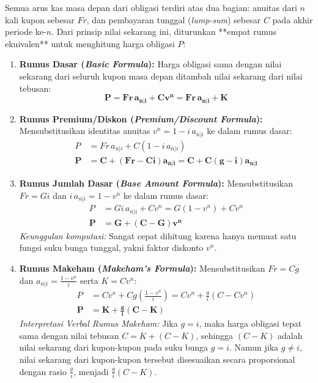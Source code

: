 \documentclass[11pt,a4paper]{article}
\begin{document}
Semua arus kas masa depan dari obligasi terdiri atas dua bagian: anuitas dari $n$ kali kupon sebesar $Fr$, dan pembayaran tunggal (\textit{lump-sum}) sebesar $C$ pada akhir periode ke-$n$. Dari prinsip nilai sekarang ini, diturunkan **empat rumus ekuivalen** untuk menghitung harga obligasi $P$:

\begin{theorembox}
\begin{enumerate}[label=\textbf{\arabic*.}]
    \item \textbf{Rumus Dasar (\textit{Basic Formula}):}
    Harga obligasi sama dengan nilai sekarang dari seluruh kupon masa depan ditambah nilai sekarang dari nilai tebusan:
    \begin{equation}
        \mathbf{P = Fr \, a_{\overline{n}|i} + C v^n = Fr \, a_{\overline{n}|i} + K}
    \end{equation}

    \item \textbf{Rumus Premium/Diskon (\textit{Premium/Discount Formula}):}
    Mensubstitusikan identitas anuitas $v^n = 1 - i \, a_{\overline{n}|i}$ ke dalam rumus dasar:
    \begin{align}
        P &= Fr \, a_{\overline{n}|i} + C(1 - i \, a_{\overline{n}|i}) \nonumber \\
        \mathbf{P} &= \mathbf{C + (Fr - Ci) a_{\overline{n}|i} = C + C(g - i) a_{\overline{n}|i}}
    \end{align}

    \item \textbf{Rumus Jumlah Dasar (\textit{Base Amount Formula}):}
    Mensubstitusikan $Fr = Gi$ dan $i \, a_{\overline{n}|i} = 1 - v^n$ ke dalam rumus dasar:
    \begin{align}
        P &= Gi \, a_{\overline{n}|i} + C v^n = G(1 - v^n) + C v^n \nonumber \\
        \mathbf{P} &= \mathbf{G + (C - G) v^n}
    \end{align}
    \textit{Keunggulan komputasi:} Sangat cepat dihitung karena hanya memuat satu fungsi suku bunga tunggal, yakni faktor diskonto $v^n$.

    \item \textbf{Rumus Makeham (\textit{Makeham's Formula}):}
    Mensubstitusikan $Fr = Cg$ dan $a_{\overline{n}|i} = \frac{1 - v^n}{i}$ serta $K = C v^n$:
    \begin{align}
        P &= C v^n + Cg \left( \frac{1 - v^n}{i} \right) = C v^n + \frac{g}{i} (C - C v^n) \nonumber \\
        \mathbf{P} &= \mathbf{K + \frac{g}{i}(C - K)}
    \end{align}
    \textit{Interpretasi Verbal Rumus Makeham:} Jika $g = i$, maka harga obligasi tepat sama dengan nilai tebusan $C = K + (C - K)$, sehingga $(C - K)$ adalah nilai sekarang dari kupon-kupon pada suku bunga $g=i$. Namun jika $g \neq i$, nilai sekarang dari kupon-kupon tersebut disesuaikan secara proporsional dengan rasio $\frac{g}{i}$, menjadi $\frac{g}{i}(C - K)$.
\end{enumerate}
\end{theorembox}
\end{document}

